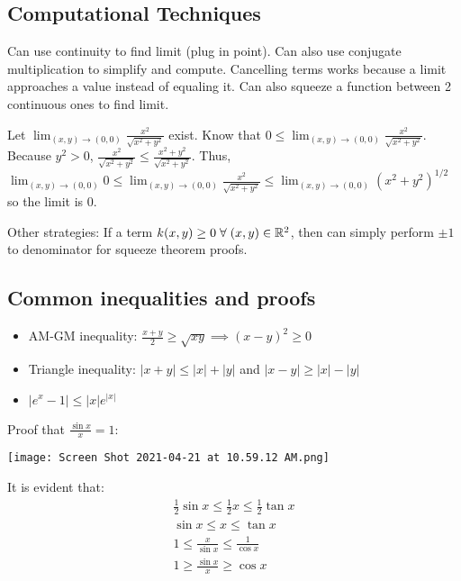 \subsection{Computational Techniques}

Can use continuity to find limit (plug in point). Can also use conjugate multiplication to simplify and compute. Cancelling terms works because a limit approaches a value instead of equaling it.
Can also squeeze a function between 2 continuous ones to find limit.

Let $\lim _{(x, y) \rightarrow(0,0)} \frac{x^{2}}{\sqrt{x^{2}+y^{2}}}$ exist.
Know that $0\leq \lim _{(x, y) \rightarrow(0,0)} \frac{x^{2}}{\sqrt{x^{2}+y^{2}}}$.
Because $y^2>0$, $\frac{x^{2}}{\sqrt{x^{2}+y^{2}}} \leq \frac{x^{2}+y^{2}}{\sqrt{x^{2}+y^{2}}}$.
Thus, $\lim _{(x, y) \rightarrow(0,0)} 0 \leq \lim _{(x, y) \rightarrow(0,0)} \frac{x^{2}}{\sqrt{x^{2}+y^{2}}} \leq \lim _{(x, y) \rightarrow(0,0)}\left(x^{2}+y^{2}\right)^{1 / 2}$
so the limit is 0.

Other strategies: If a term $k(x,y)\geq 0\;\forall\; (x,y)\in \mathbb{R}^2$, then can simply perform $\pm 1$ to denominator for squeeze theorem proofs.

\subsection{Common inequalities and proofs}

\begin{itemize}
    \item AM-GM inequality: $\frac{x+y}{2}\geq \sqrt{xy}\implies (x-y)^2\geq 0$
    \item Triangle inequality: $|x+y|\leq |x|+|y|$ and $|x-y|\geq |x|-|y|$
    \item $|e^x-1|\leq |x|e^{|x|}$
\end{itemize}

Proof that $\frac{\sin x}{x}=1$:

\begin{center}
    \texttt{[image: Screen Shot 2021-04-21 at 10.59.12 AM.png]}
\end{center}

It is evident that:
\begin{gather}
    \frac{1}{2}\sin x\leq \frac{1}{2}x\leq \frac{1}{2}\tan x\\
    \sin x\leq x \leq \tan x\\
    1\leq \frac{x}{\sin x}\leq \frac{1}{\cos x}\\
    1\geq \frac{\sin x}{x}\geq \cos x
\end{gather}

